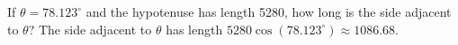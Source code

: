 {If $\theta = 78.123^{\circ}$ and the hypotenuse has length 5280, how long is the side adjacent to $\theta$?}
{The side adjacent to $\theta$ has length $5280\cos(78.123^{\circ}) \approx 1086.68$.}
